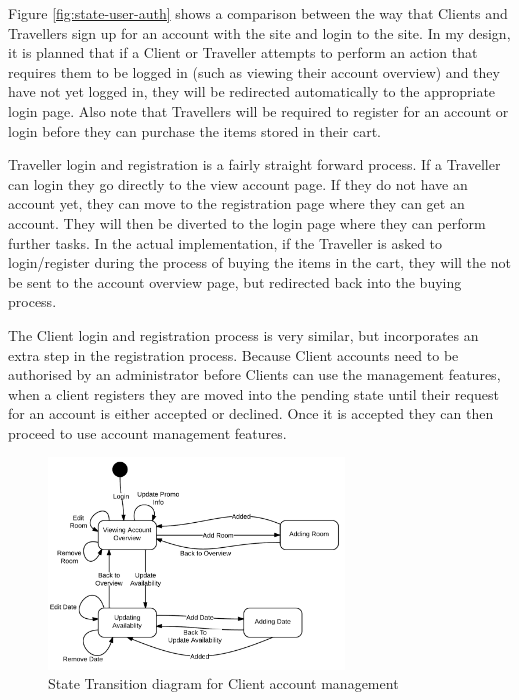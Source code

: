\documentclass{article}
\begin{document}
Figure \ref{fig:state-user-auth} shows a comparison between the way that Clients and Travellers sign up for an account with the site and login to the site. In my design, it is planned that if a Client or Traveller attempts to perform an action that requires them to be logged in (such as viewing their account overview) and they have not yet logged in, they will be redirected automatically to the appropriate login page. Also note that Travellers will be required to register for an account or login before they can purchase the items stored in their cart.

Traveller login and registration is a fairly straight forward process. If a Traveller can login they go directly to the view account page. If they do not have an account yet, they can move to the registration page where they can get an account. They will then be diverted to the login page where they can perform further tasks. In the actual implementation, if the Traveller is asked to login/register during the process of buying the items in the cart, they will the not be sent to the account overview page, but redirected back into the buying process.

The Client login and registration process is very similar, but incorporates an extra step in the registration process. Because Client accounts need to be authorised by an administrator before Clients can use the management features, when a client registers they are moved into the pending state until their request for an account is either accepted or declined. Once it is accepted they can then proceed to use account management features.

\begin{figure}[H]
\centering
\includegraphics[width=0.7\textwidth]{img/state_diagrams/StateTransitionClientManagement.png}
\caption{State Transition diagram for Client account management}
\label{fig:state-client-manage}
\end{figure}
\end{document}
